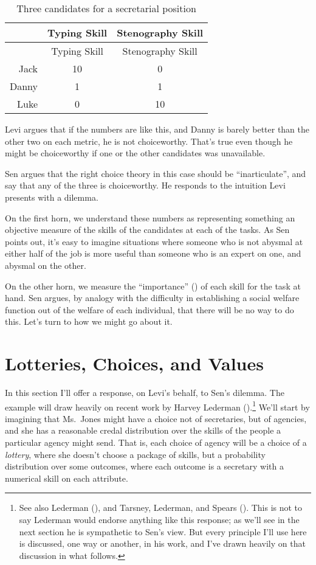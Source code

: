\documentclass[
  11pt,
  letterpaper,
  DIV=11,
  numbers=noendperiod,
  twoside]{scrartcl}
\begin{document}
\begin{longtable}[]{@{}rcc@{}}
\caption{Three candidates for a secretarial
position}\label{tbl-secretaries}\tabularnewline
\toprule\noalign{}
& Typing Skill & Stenography Skill \\
\midrule\noalign{}
\endfirsthead
\toprule\noalign{}
& Typing Skill & Stenography Skill \\
\midrule\noalign{}
\endhead
\bottomrule\noalign{}
\endlastfoot
Jack & 10 & 0 \\
Danny & 1 & 1 \\
Luke & 0 & 10 \\
\end{longtable}

Levi argues that if the numbers are like this, and Danny is barely
better than the other two on each metric, he is not choiceworthy. That's
true even though he might be choiceworthy if one or the other candidates
was unavailable.

Sen argues that the right choice theory in this case should be
``inarticulate'', and say that any of the three is choiceworthy. He
responds to the intuition Levi presents with a dilemma.

On the first horn, we understand these numbers as representing something
an objective measure of the skills of the candidates at each of the
tasks. As Sen points out, it's easy to imagine situations where someone
who is not abysmal at either half of the job is more useful than someone
who is an expert on one, and abysmal on the other.

On the other horn, we measure the ``importance''
() of each skill for the task at
hand. Sen argues, by analogy with the difficulty in establishing a
social welfare function out of the welfare of each individual, that
there will be no way to do this. Let's turn to how we might go about it.

\section{Lotteries, Choices, and Values}\label{sec-lotteries}

In this section I'll offer a response, on Levi's behalf, to Sen's
dilemma. The example will draw heavily on recent work by Harvey Lederman
().\footnote{See also Lederman
  (), and Tarsney, Lederman, and Spears
  (). This is not to say
  Lederman would endorse anything like this response; as we'll see in
  the next section he is sympathetic to Sen's view. But every principle
  I'll use here is discussed, one way or another, in his work, and I've
  drawn heavily on that discussion in what follows.} We'll start by
imagining that Ms.~Jones might have a choice not of secretaries, but of
agencies, and she has a reasonable credal distribution over the skills
of the people a particular agency might send. That is, each choice of
agency will be a choice of a \emph{lottery}, where she doesn't choose a
package of skills, but a probability distribution over some outcomes,
where each outcome is a secretary with a numerical skill on each
attribute.
\end{document}
